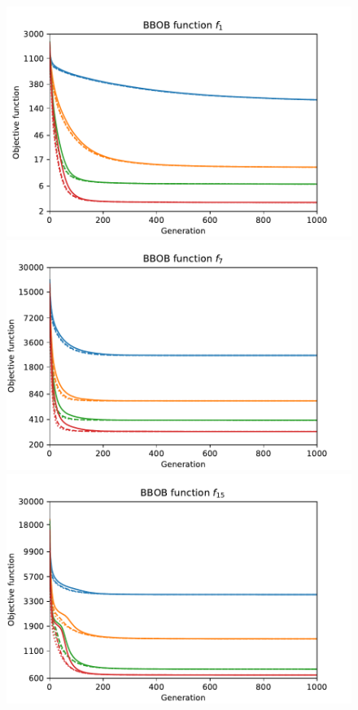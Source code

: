 \begin{figure}[ht!]
    \begin{minipage}[t]{0.32\textwidth}
        \centering
        \includegraphics[width=\textwidth]{img/runs/fitness_pso2006_f1.pdf}
    \end{minipage}
    \hfill
    \begin{minipage}[t]{0.32\textwidth}
        \centering
        \includegraphics[width=\textwidth]{img/runs/fitness_pso2006_f7.pdf}
    \end{minipage}
    \hfill
    \begin{minipage}[t]{0.32\textwidth}
        \centering
        \includegraphics[width=\textwidth]{img/runs/fitness_pso2006_f15.pdf}
    \end{minipage}


\end{figure}
